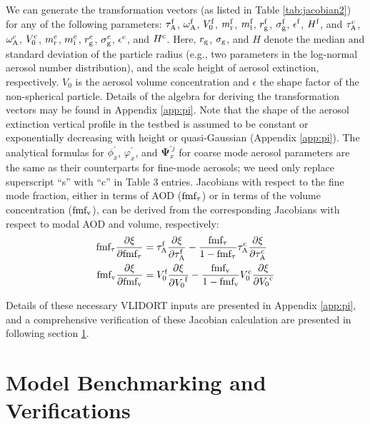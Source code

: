 We can generate the transformation vectors (as listed in Table
\ref{tab:jacobian2}) for any of the following parameters: $\tau_\text{A}^\text{f}$, 
$\omega_\text{A}^\text{f}$, $V_0^\text{f}$, $m_\text{r}^\text{f}$, $m_\text{i}^\text{f}$, $r_\text{g}^\text{f}$,
$\sigma_\text{g}^\text{f}$, $\epsilon^\text{f}$, $H^\text{f}$, and $\tau_\text{A}^\text{c}$,
$\omega_\text{A}^\text{c}$, $V_0^\text{c}$, $m_\text{r}^\text{c}$, $m_\text{i}^\text{c}$,
$r_\text{g}^\text{c}$, $\sigma_\text{g}^\text{c}$, $\epsilon^\text{c}$, and $H^\text{c}$. Here,
$r_\text{g}$, $\sigma_\text{g}$, and $H$ denote the median and standard deviation of the
particle radius (e.g., two parameters in the log-normal aerosol number
distribution), and the scale height of aerosol extinction, respectively.
$V_0$ is the aerosol volume concentration and $\epsilon$ the shape 
factor of the non-spherical particle. Details of the algebra for deriving 
the transformation vectors may be found in Appendix \ref{app:pi}. 
Note that the shape of the aerosol extinction vertical profile in the
testbed is assumed to be constant or exponentially decreasing with
height or quasi-Gaussian (Appendix \ref{app:pi}). The analytical
formulas for $\phi_x^\prime$, $\varphi_x^\prime$, and
$\pmb{\Psi}_x^{\prime j}$ for coarse mode aerosol parameters are
the same as their counterparts for fine-mode aerosols; we need only
replace superscript “s” with “c” in Table 3 entries. Jacobians with
respect to the fine mode fraction, either in terms of AOD
($\text{fmf}_\tau$) or in terms of the volume concentration ($\text{fmf}_\text{v}$), 
can be derived from the corresponding Jacobians with respect to 
modal AOD and volume, respectively:
\begin{align}
\text{fmf}_\tau\frac{\partial\xi}{\partial\text{fmf}_\tau} & = 
   \tau_\text{A}^\text{f}\frac{\partial\xi}{\partial\tau_\text{A}^\text{f}} - 
   \frac{\text{fmf}_\tau}{1-\text{fmf}_\tau}\tau_\text{A}^\text{c}\frac{\partial\xi}{\partial\tau_\text{A}^\text{c}} \\
\text{fmf}_\text{v}\frac{\partial\xi}{\partial\text{fmf}_\text{v}} & = 
   V_0^\text{f}\frac{\partial\xi}{\partial{V_0}^\text{f}} - 
   \frac{\text{fmf}_\text{v}}{1-\text{fmf}_\text{v}}V_0^\text{c}\frac{\partial\xi}{\partial{V_0}^\text{c}}
\end{align}

Details of these necessary VLIDORT inputs are presented in Appendix
\ref{app:pi}, and a comprehensive verification of these Jacobian calculation are
presented in following section {\ref{sec:rtmverify}}.

\section{Model Benchmarking and Verifications} \label{sec:rtmverify}

